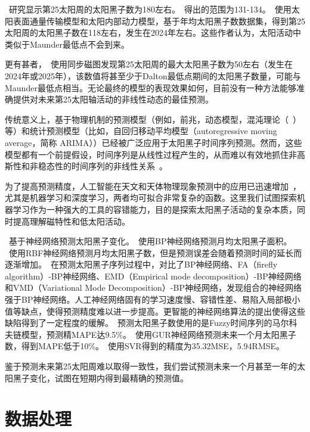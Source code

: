~\citet{pesnell2018effects}研究显示第25太阳周的太阳黑子数为180左右。~\citet{bisoi2020another}得出的范围为131-134。~\citet{bhowmik2018prediction}使用太阳表面通量传输模型和太阳内部动力模型，基于年均太阳黑子数数据集，得到第25太阳周的太阳黑子数在118左右，发生在2024年左右。这些作者认为，太阳活动中类似于Maunder最低点不会到来。

更有甚者，~\citep{kitiashvili2020application}使用同步磁图发现第25太阳周的最大太阳黑子数为50左右（发生在2024年或2025年），该数值将甚至少于Dalton最低点期间的太阳黑子数量，可能与Maunder最低点相当。无论最终的模型的表现效果如何，目前没有一种方法能够准确提供对未来第25太阳轴活动的非线性动态的最佳预测。

传统意义上，基于物理机制的预测模型（例如，前兆，动态模型，混沌理论（~\citep{jie2012prediction}）等）和统计预测模型（比如，自回归移动平均模型（autoregressive moving average，简称 ARIMA））已经被广泛应用于太阳黑子时间序列预测。然而，这些模型都有一个前提假设，时间序列是从线性过程产生的，从而难以有效地抓住非高斯性和非稳态性的时间序列的非线性关系~\citep{jiang2011sunspot,arlt2015solar}。

为了提高预测精度，人工智能在天文和天体物理现象预测中的应用已迅速增加~\citep{pala2019forecasting,fluke2020surveying}，尤其是机器学习和深度学习，两者均可拟合非常复杂的函数。这里我们试图探索机器学习作为一种强大的工具的容错能力，目的是探索太阳黑子活动的复杂本质，同时提高理解磁特性和低太阳活动。

~\citet{ren2014neural}基于神经网络预测太阳黑子变化。~\citet{ding2012prediction}使用BP神经网络预测月均太阳黑子面积。
~\citet{zhao2008prediction}使用RBF神经网络预测月均太阳黑子数，但是预测误差会随着预测时间的延长而逐渐增加。~\citet{li2018hybrid}在预测太阳黑子序列过程中，对比了BP神经网络、FA（firefly algorithm）-BP神经网络、EMD（Empirical mode decomposition）-BP神经网络和VMD（Variational Mode Decomposition）-BP神经网络，发现组合的神经网络强于BP神经网络。人工神经网络固有的学习速度慢、容错性差、易陷入局部极小值等缺点，使得预测精度难以进一步提高。更智能的神经网络算法的提出使得这些缺陷得到了一定程度的缓解。~\citet{novitasari2019flare}预测太阳黑子数使用的是Fuzzy时间序列的马尔科夫链模型，预测精MAPE达9.5\%。~\citet{arfianti15sunspot}使用GUR神经网络预测未来一个月太阳黑子数，得到MAPE低于10\%。~\citet{suwanto2019prediksi}使用SVR得到的精度为35.32MSE，5.94RMSE。

鉴于预测未来第25太阳周难以取得一致性，我们尝试预测未来一个月甚至一年的太阳黑子变化，试图在短期内得到最精确的预测值。

\section{数据处理}


